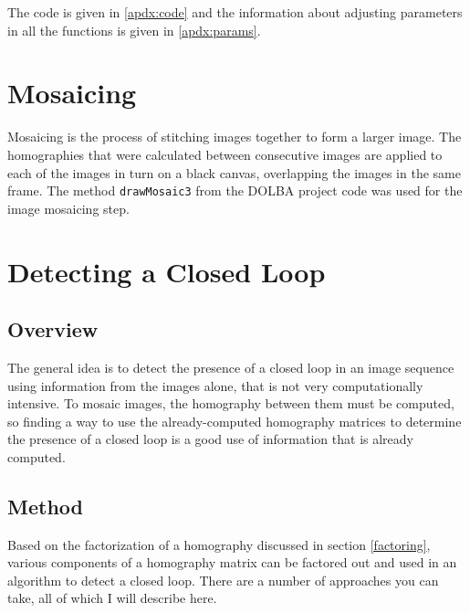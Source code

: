 \documentclass{article}
\begin{document}
The code is given in \ref{apdx:code} and the information about adjusting
parameters in all the functions is given in \ref{apdx:params}.

\section{Mosaicing}

Mosaicing is the process of stitching images together to form a larger image.
The homographies that were calculated between consecutive images are applied to
each of the images in turn on a black canvas, overlapping the images in the
same frame. The method \texttt{drawMosaic3} from the DOLBA project code was
used for the image mosaicing step.  

\section{Detecting a Closed Loop}

\subsection{Overview}

The general idea is to detect the presence of a closed loop in an image
sequence using information from the images alone, that is not very
computationally intensive. To mosaic images, the homography between them must
be computed, so finding a way to use the already-computed homography matrices
to determine the presence of a closed loop is a good use of information that is
already computed. 

\subsection{Method}
\label{sec:subm}

Based on the factorization of a homography discussed in section \ref{factoring},
various components of a homography matrix can be factored out and used in an
algorithm to detect a closed loop. There are a number of approaches you can
take, all of which I will describe here.
\end{document}
